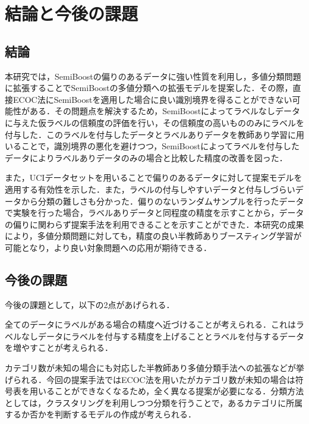 \chapter{結論と今後の課題}

\section{結論}
\label{sec:結論}
本研究では，SemiBoostの偏りのあるデータに強い性質を利用し，多値分類問題に拡張することでSemiBoostの多値分類への拡張モデルを提案した．その際，直接ECOC法にSemiBoostを適用した場合に良い識別境界を得ることができない可能性がある．その問題点を解決するため，SemiBoostによってラベルなしデータに与えた仮ラベルの信頼度の評価を行い，その信頼度の高いもののみにラベルを付与した．このラベルを付与したデータとラベルありデータを教師あり学習に用いることで，識別境界の悪化を避けつつ，SemiBoostによってラベルを付与したデータによりラベルありデータのみの場合と比較した精度の改善を図った．\par
また，UCIデータセットを用いることで偏りのあるデータに対して提案モデルを適用する有効性を示した．また，ラベルの付与しやすいデータと付与しづらいデータから分類の難しさも分かった．偏りのないランダムサンプルを行ったデータで実験を行った場合，ラベルありデータと同程度の精度を示すことから，データの偏りに関わらず提案手法を利用できることを示すことができた．本研究の成果により，多値分類問題に対しても，精度の良い半教師ありブースティング学習が可能となり，より良い対象問題への応用が期待できる．\par

\section{今後の課題}
\label{sec:今後の課題}
今後の課題として，以下の2点があげられる．\par
全てのデータにラベルがある場合の精度へ近づけることが考えられる．これはラベルなしデータにラベルを付与する精度を上げることとラベルを付与するデータを増やすことが考えられる．\par
カテゴリ数が未知の場合にも対応した半教師あり多値分類手法への拡張などが挙げられる．今回の提案手法ではECOC法を用いたがカテゴリ数が未知の場合は符号表を用いることができなくなるため，全く異なる提案が必要になる．分類方法としては，クラスタリングを利用しつつ分類を行うことで，あるカテゴリに所属するか否かを判断するモデルの作成が考えられる．\par
